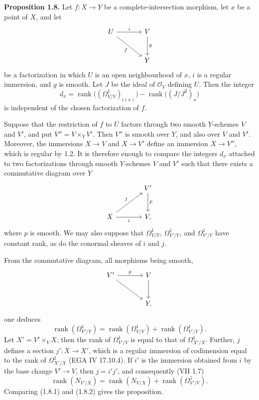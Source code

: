 \documentclass[11pt]{article}
\begin{document}
\textbf{Proposition 1.8.} Let $f:X\to Y$ be a complete-intersection morphism, let $x$ be a point of $X$, and let
\[
\begin{tikzcd}[column sep=large,row sep=large]
U \arrow[r,"i"] \arrow[dr,"f"'] & V \arrow[d,"g"]\\
& Y
\end{tikzcd}
\]
be a factorization in which $U$ is an open neighbourhood of $x$, $i$ is a regular immersion, and $g$ is smooth. Let $J$ be the ideal of $\mathcal O_V$ defining $U$. Then the integer
\[
d_x=\operatorname{rank}\bigl((\Omega^1_{V/Y})_{i(x)}\bigr)-\operatorname{rank}\bigl((J/J^2)_x\bigr)
\]
is independent of the chosen factorization of $f$.

Suppose that the restriction of $f$ to $U$ factors through two smooth $Y$-schemes $V$ and $V'$, and put $V''=V\times_Y V'$. Then $V''$ is smooth over $Y$, and also over $V$ and $V'$. Moreover, the immersions $X\to V$ and $X\to V'$ define an immersion $X\to V''$, which is regular by 1.2. It is therefore enough to compare the integers $d_x$ attached to two factorizations through smooth $Y$-schemes $V$ and $V'$ such that there exists a commutative diagram over $Y$
\[
\begin{tikzcd}[column sep=large,row sep=large]
& V' \arrow[d,"p"]\\
X \arrow[ur,"j"] \arrow[r,"i"'] & V,
\end{tikzcd}
\]
where $p$ is smooth. We may also suppose that $\Omega^1_{V/Y}$, $\Omega^1_{V'/Y}$, and $\Omega^1_{V'/V}$ have constant rank, as do the conormal sheaves of $i$ and $j$.

From the commutative diagram, all morphisms being smooth,
\[
\begin{tikzcd}[column sep=large,row sep=large]
V' \arrow[r,"p"] \arrow[dr] & V \arrow[d]\\
& Y,
\end{tikzcd}
\]
one deduces
\begin{equation}\tag{1.8.1}
\operatorname{rank}(\Omega^1_{V'/Y})=
\operatorname{rank}(\Omega^1_{V/Y})+
\operatorname{rank}(\Omega^1_{V'/V}).
\end{equation}
Let $X'=V'\times_V X$; then the rank of $\Omega^1_{V'/V}$ is equal to that of $\Omega^1_{X'/X}$. Further, $j$ defines a section $j':X\to X'$, which is a regular immersion of codimension equal to the rank of $\Omega^1_{X'/X}$ (EGA IV 17.10.4). If $i'$ is the immersion obtained from $i$ by the base change $V'\to V$, then $j=i'j'$, and consequently (VII 1.7)
\begin{equation}\tag{1.8.2}
\operatorname{rank}(N_{V'/X})=
\operatorname{rank}(N_{V/X})+
\operatorname{rank}(\Omega^1_{V'/V}).
\end{equation}
Comparing (1.8.1) and (1.8.2) gives the proposition.
\end{document}
